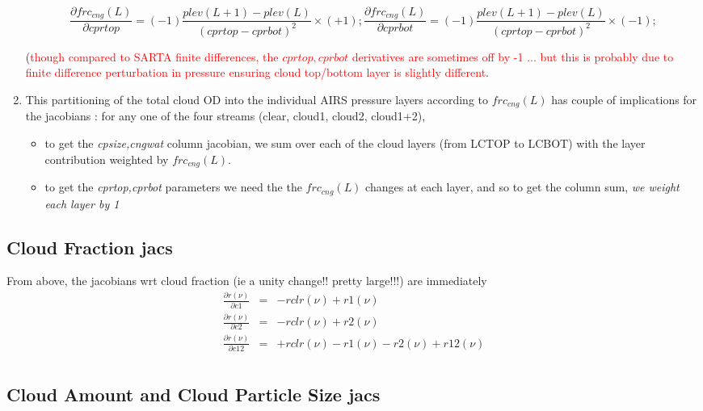 \documentclass[11pt]{article}
\newcommand{\sa}{\textsf{SARTA}\xspace}
\begin{document}
\begin{enumerate}
\[
\frac{\partial frc_{cng}(L)}{\partial cprtop} = (-1) \frac{plev(L+1)-plev(L)}{(cprtop-cprbot)^2} \times (+1);
\frac{\partial frc_{cng}(L)}{\partial cprbot} = (-1) \frac{plev(L+1)-plev(L)}{(cprtop-cprbot)^2} \times (-1);
\]

(\textcolor{red}{though compared to \sa finite differences, the
  $cprtop,cprbot$ derivatives are sometimes off by -1 ... but this is
  probably due to finite difference perturbation in pressure ensuring
  cloud top/bottom layer is slightly different}.

\item This partitioning of the total cloud OD into the individual AIRS
  pressure layers according to $frc_{cng}(L)$ has couple of
  implications for the jacobians : for any one of the four streams
  (clear, cloud1, cloud2, cloud1+2), 
  \begin{itemize}

  \item to get the \textit{cpsize,cngwat} column jacobian, we sum over
    each of the cloud layers (from LCTOP to LCBOT) with the layer
    contribution weighted by $frc_{cng}(L)$.

  \item to get the \textit{cprtop,cprbot} parameters we need the the
    $frc_{cng}(L)$ changes at each layer, and so to get the column
    sum, \textit{we weight each layer by 1}

  \end{itemize}
\end{enumerate}

\subsection{Cloud Fraction jacs}
From above, the jacobians wrt cloud fraction (ie a unity change!! pretty large!!!) are immediately
\[
\begin{array}{ccc}
\frac{\partial r(\nu)}{\partial c1} & = & -rclr(\nu) + r1(\nu) \\
\frac{\partial r(\nu)}{\partial c2} & = & -rclr(\nu) + r2(\nu) \\
\frac{\partial r(\nu)}{\partial c12} & = & +rclr(\nu) - r1(\nu) - r2(\nu) + r12(\nu) \\
\end{array}
\]

\subsection{Cloud Amount and Cloud Particle Size jacs}
\end{document}
